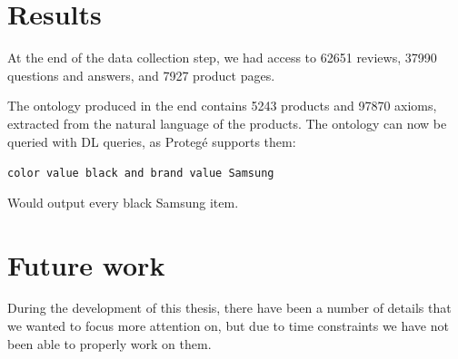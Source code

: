 \documentclass[LaM,oneside,binding=0.6cm]{sapthesis}
\begin{document}
\section{Results}

At the end of the data collection step, we had access to 62651 reviews, 37990 questions and answers, and 7927 product pages. 

The ontology produced in the end contains 5243 products and 97870 axioms, extracted from the natural language of the products. 
The ontology can now be queried with DL queries, as Protegé supports them: 
\begin{center}
\texttt{color value black and brand value Samsung} \\
\end{center}
Would output every black Samsung item. 

\section{Future work}

During the development of this thesis, there have been a number of details that we wanted to focus more attention on, but due to time constraints we have not been able to properly work on them.
\end{document}
